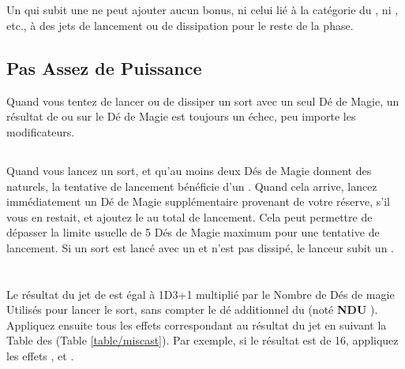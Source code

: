 \hypertarget{lostfocus}{\subsection{\lostfocus}}

Un \wizard{} qui subit une \lostfocus{} ne peut ajouter aucun bonus, ni celui lié à la catégorie du \wizard{}, ni \overwhelmingpower{}, etc., à des jets de lancement ou de dissipation pour le reste de la phase.

\subsection{Pas Assez de Puissance}

Quand vous tentez de lancer ou de dissiper un sort avec un seul Dé de Magie, un résultat de  ou  sur le Dé de Magie est toujours un échec, peu importe les modificateurs.

\subsection{\overwhelmingpower}

Quand vous lancez un sort, et qu'au moins deux Dés  de Magie donnent des  naturels, la tentative de lancement bénéficie d'un \overwhelmingpower{}. Quand cela arrive, lancez immédiatement un Dé de Magie supplémentaire provenant de votre réserve, s'il vous en restait, et ajoutez le au total de lancement. Cela peut permettre de dépasser la limite usuelle de 5 Dés de Magie maximum pour une tentative de lancement. Si un sort est lancé avec un \overwhelmingpower{} et n'est pas dissipé, le lanceur subit un \miscast{}.

\newpage
\hypertarget{miscast}{\section{\miscast}}
\label{miscast}

Le résultat du jet de \miscast{} est égal à 1D3+1 multiplié par le Nombre de Dés de magie Utilisés pour lancer le sort, sans compter le dé additionnel du \overwhelmingpower{} (noté \og \textbf{NDU} \fg{}). Appliquez ensuite tous les effets correspondant au résultat du jet en suivant la Table des \miscasts{} (Table \ref{table/miscast}). Par exemple, si le résultat est de 16, appliquez les effets \witchfire{}, \amnesia{} et \catastrophicdetonation{}.

